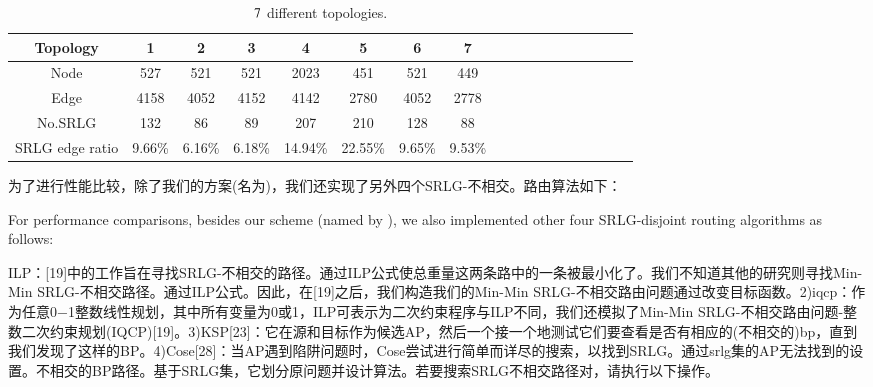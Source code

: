 \begin{table}[tp]
\caption{$7$ different topologies.}
  \centering
\footnotesize{  \begin{tabular}{*{18}{c}}
\toprule
Topology & 1 & 2 & 3 & 4 & 5 & 6& 7   \\
\midrule
Node    &     527&      521    &      521     &    2023             &     451     &     521     &     449       \\
Edge   &    4158 &  4052     &    4152      &   4142          &       2780   &      4052   &      2778    \\
No.SRLG & 132 &  86   &  89  &  207        & 210  &  128  &   88    \\
SRLG edge ratio & 9.66\% & 6.16\% &   6.18\% &   14.94\%    &   22.55\%  &  9.65\% &   9.53\%     \\
\bottomrule
\end{tabular}
}

\label{tab:AllSample}
\end{table}

为了进行性能比较，除了我们的方案(名为)，我们还实现了另外四个SRLG-不相交。路由算法如下：

For performance comparisons, besides our scheme (named by \CI), we also implemented other four SRLG-disjoint routing algorithms as follows:

ILP：[19]中的工作旨在寻找SRLG-不相交的路径。通过ILP公式使总重量这两条路中的一条被最小化了。我们不知道其他的研究则寻找Min-Min SRLG-不相交路径。通过ILP公式。因此，在[19]之后，我们构造我们的Min-Min SRLG-不相交路由问题通过改变目标函数。2)iqcp：作为任意0−1整数线性规划，其中所有变量为0或1，ILP可表示为二次约束程序与ILP不同，我们还模拟了Min-Min SRLG-不相交路由问题-整数二次约束规划(IQCP)[19]。3)KSP[23]：它在源和目标作为候选AP，然后一个接一个地测试它们要查看是否有相应的(不相交的)bp，直到我们发现了这样的BP。4)Cose[28]：当AP遇到陷阱问题时，Cose尝试进行简单而详尽的搜索，以找到SRLG。通过srlg集的AP无法找到的设置。不相交的BP路径。基于SRLG集，它划分原问题并设计算法。若要搜索SRLG不相交路径对，请执行以下操作。


